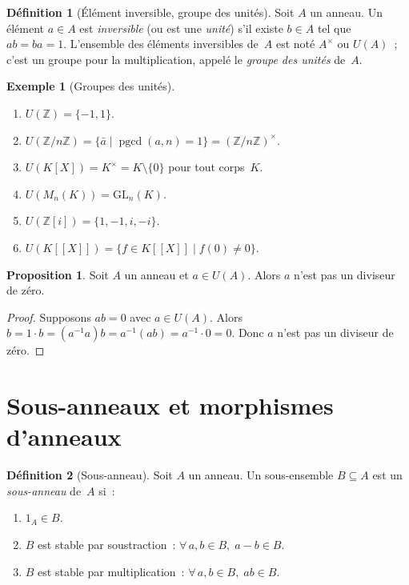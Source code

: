 \documentclass[12pt,a4paper,openany]{book}
\theoremstyle{definition}
\newtheorem{definition}{Définition}[chapter]
\newtheorem{proposition}{Proposition}[chapter]
\newtheorem{exemple}{Exemple}[chapter]
\newcommand{\Z}{\mathbb{Z}}
\DeclareMathOperator{\pgcd}{pgcd}
\begin{document}
\begin{definition}[Élément inversible, groupe des unités]%
\label{def:element-inversible}
Soit $A$ un anneau. Un élément $a \in A$ est \emph{inversible}
(ou est une \emph{unité}) s'il existe $b \in A$ tel que $ab = ba = 1$.
L'ensemble des éléments inversibles de~$A$ est noté $A^\times$ ou
$U(A)$~; c'est un groupe pour la multiplication,
appelé le \emph{groupe des unités} de~$A$.
\end{definition}

\begin{exemple}[Groupes des unités]\label{ex:groupes-unites}
\begin{enumerate}[label=\textup{(\alph*)}]
  \item $U(\Z) = \{-1, 1\}$.
  \item $U(\Z/n\Z) = \{\bar{a} \mid \pgcd(a,n) = 1\}
         = (\Z/n\Z)^\times$\index{$(\Z/n\Z)^\times$}.
  \item $U(K[X]) = K^\times = K \setminus \{0\}$ pour tout corps~$K$.
  \item $U(M_n(K)) = \mathrm{GL}_n(K)$.
  \item $U(\Z[i]) = \{1, -1, i, -i\}$.
  \item $U(K[[X]]) = \{f \in K[[X]] \mid f(0) \neq 0\}$.
\end{enumerate}
\end{exemple}

\begin{proposition}\label{prop:inversible-non-diviseur}
Soit $A$ un anneau et $a \in U(A)$. Alors $a$ n'est pas un diviseur
de zéro.
\end{proposition}

\begin{proof}
Supposons $ab = 0$ avec $a \in U(A)$. Alors
$b = 1 \cdot b = (a^{-1}a)b = a^{-1}(ab) = a^{-1} \cdot 0 = 0$.
Donc $a$ n'est pas un diviseur de zéro.
\end{proof}

\section{Sous-anneaux et morphismes d'anneaux}%
\label{sec:morphismes-anneaux}

\begin{definition}[Sous-anneau]\label{def:sous-anneau}
Soit $A$ un anneau. Un sous-ensemble $B \subseteq A$ est un
\emph{sous-anneau} de~$A$ si~:
\begin{enumerate}[label=\textup{(\roman*)}]
  \item $1_A \in B$.
  \item $B$ est stable par soustraction~: $\forall\, a, b \in B,\;
        a - b \in B$.
  \item $B$ est stable par multiplication~: $\forall\, a, b \in B,\;
        ab \in B$.
\end{enumerate}
\end{definition}
\end{document}
